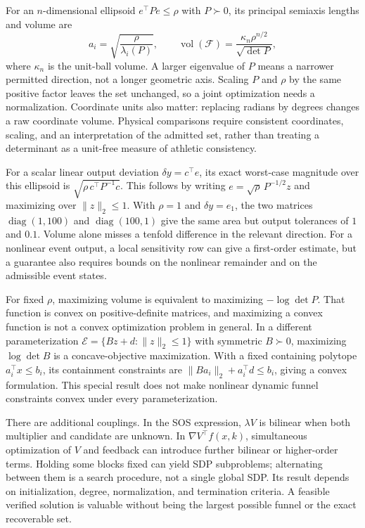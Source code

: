 \documentclass[12pt, openany]{book}
\theoremstyle{plain}
\begin{document}
For an $n$-dimensional ellipsoid $e^\top P e\leq\rho$ with $P\succ0$, its principal semiaxis lengths and volume are
\begin{equation}
 a_i=\sqrt{\frac{\rho}{\lambda_i(P)}},\qquad
 \operatorname{vol}(\mathcal F)=\frac{\kappa_n\rho^{n/2}}{\sqrt{\det P}},
 \label{eq:funnel_ellipsoid_volume}
\end{equation}
where $\kappa_n$ is the unit-ball volume. A larger eigenvalue of $P$ means a narrower permitted direction, not a longer geometric axis. Scaling $P$ and $\rho$ by the same positive factor leaves the set unchanged, so a joint optimization needs a normalization. Coordinate units also matter: replacing radians by degrees changes a raw coordinate volume. Physical comparisons require consistent coordinates, scaling, and an interpretation of the admitted set, rather than treating a determinant as a unit-free measure of athletic consistency.

For a scalar linear output deviation $\delta y=c^\top e$, its exact worst-case magnitude over this ellipsoid is $\sqrt{\rho\,c^\top P^{-1}c}$. This follows by writing $e=\sqrt\rho\,P^{-1/2}z$ and maximizing over $\|z\|_2\leq1$. With $\rho=1$ and $\delta y=e_1$, the two matrices $\operatorname{diag}(1,100)$ and $\operatorname{diag}(100,1)$ give the same area but output tolerances of $1$ and $0.1$. Volume alone misses a tenfold difference in the relevant direction. For a nonlinear event output, a local sensitivity row can give a first-order estimate, but a guarantee also requires bounds on the nonlinear remainder and on the admissible event states.

For fixed $\rho$, maximizing volume is equivalent to maximizing $-\log\det P$. That function is convex on positive-definite matrices, and maximizing a convex function is not a convex optimization problem in general. In a different parameterization $\mathcal E=\{Bz+d:\|z\|_2\leq1\}$ with symmetric $B\succ0$, maximizing $\log\det B$ is a concave-objective maximization. With a fixed containing polytope $a_i^\top x\leq b_i$, its containment constraints are $\|Ba_i\|_2+a_i^\top d\leq b_i$, giving a convex formulation. This special result does not make nonlinear dynamic funnel constraints convex under every parameterization.

There are additional couplings. In the SOS expression, $\lambda V$ is bilinear when both multiplier and candidate are unknown. In $\nabla V^\top f(x,k)$, simultaneous optimization of $V$ and feedback can introduce further bilinear or higher-order terms. Holding some blocks fixed can yield SDP subproblems; alternating between them is a search procedure, not a single global SDP. Its result depends on initialization, degree, normalization, and termination criteria. A feasible verified solution is valuable without being the largest possible funnel or the exact recoverable set.
\end{document}
